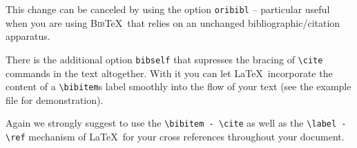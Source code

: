 \documentclass[draft]{ltxguide}[1995/11/28]
\begin{document}
This change can be canceled by using the option \verb|oribibl| --
particular useful when you are using \textsc{Bib}\TeX\ that relies on an
unchanged bibliographic/citation apparatus.

There is the additional option \verb|bibself| that supresses the
bracing of \verb|\cite| commands in the text altogether. With it you can
let \LaTeX\ incorporate the content of a \verb|\bibitem|s label
smoothly into the flow of your text (see the example file for
demonstration).

Again we strongly suggest to use the \verb|\bibitem - \cite| as well as
the \verb|\label -| \verb|\ref| mechanism of \LaTeX\ for your cross
references throughout your document.
\end{document}
